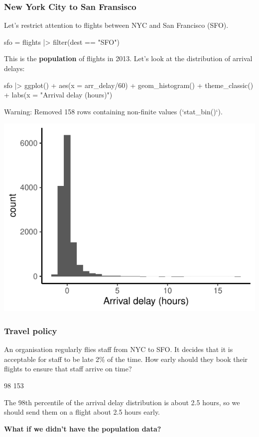 \documentclass[a4paper]{article}\usepackage[]{graphicx}\usepackage[]{xcolor}
\makeatletter
\def\maxwidth{ %
  \ifdim\Gin@nat@width>\linewidth
    \linewidth
  \else
    \Gin@nat@width
  \fi
}
\makeatother
\begin{document}
\subsubsection{New York City to San Fransisco}
Let's restrict attention to flights between NYC and San Francisco (SFO).
\begin{Schunk}
\begin{Sinput}
sfo = flights |> filter(dest == "SFO")
\end{Sinput}
\end{Schunk}
This is the \textbf{population} of flights in 2013. Let's look at the distribution of arrival delays:
\begin{Schunk}
\begin{Sinput}
sfo |> ggplot() + aes(x = arr_delay/60) +
  geom_histogram() + 
  theme_classic() +
  labs(x = "Arrival delay (hours)")
\end{Sinput}
\begin{Soutput}
Warning: Removed 158 rows containing non-finite values (`stat_bin()`).
\end{Soutput}


{\centering \includegraphics[width=\maxwidth]{figure/listings-unnamed-chunk-176-1} 

}

\end{Schunk}
\subsubsection{Travel policy}
An organisation regularly flies staff from NYC to SFO. It decides that it is acceptable for staff to be late 2\% of the time. How early should they book their flights to ensure that staff arrive on time?
\begin{Schunk}
\begin{Soutput}
98%
153 
\end{Soutput}
\end{Schunk}
The 98th percentile of the arrival delay distribution is about 2.5 hours, so we should send them on a flight about 2.5 hours early.
\begin{greenbox}
	\textbf{What if we didn't have the population data?}
\end{greenbox}
\end{document}
